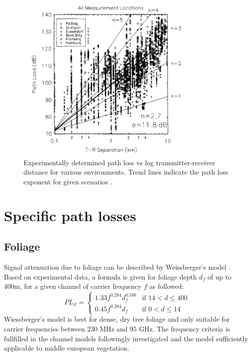 \begin{figure}[htb]
    \begin{center}
        \includegraphics[width=0.8\textwidth]{smba_ple}
        \caption{Experimentally determined path loss vs log transmitter-receiver distance for various environments.
        Trend lines indicate the path loss exponent for given scenarios \cite{seidel1991path}.}
        \label{fig:ple}
    \end{center}
\end{figure}


\section{Specific path losses}
\subsection{Foliage}
Signal attenuation due to foliage can be described by Weissberger's model \cite{weissberger1982initial}. Based 
on experimental data, a formula is given for foliage depth $d_f$ of up to 400m, 
for a given channel of carrier frequency $f$ as followed: 
\begin{equation} \label{eq:pl-foliage}
    PL_F = 
    \begin{cases}
        1.33 f^{0.284} d_f^{0.588} & \text{if $14 < d \leq 400$} \\
        0.45 f^{0.284} d_f         & \text{if $0  < d \leq 14$}
    \end{cases}
\end{equation}
Wiessberger's model is best for dense, dry tree foliage and only suitable for carrier
frequencies between $230$ MHz and $95$ GHz. The frequency criteria is fullfilled in the 
channel models followingly investigated and the model sufficiently applicable to middle 
european vegetation. 

